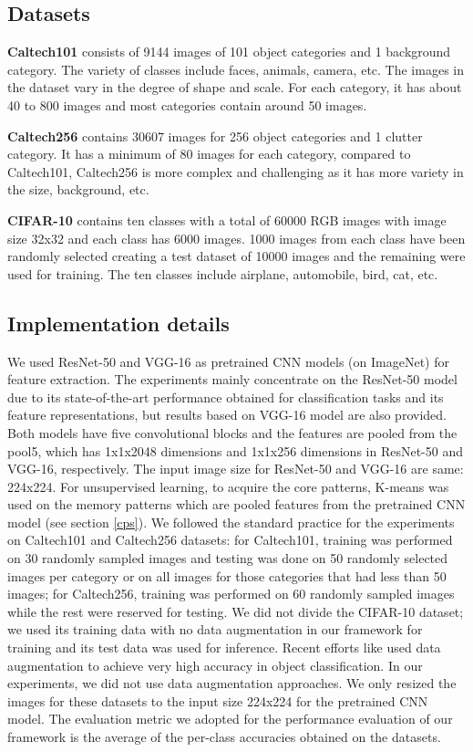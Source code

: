 \documentclass[conference]{IEEEtran}
\begin{document}
\subsection{Datasets}
\textbf{Caltech101} consists of 9144 images of 101 object categories and 1 background category. The variety of classes include faces, animals, camera, etc. The images in the dataset vary in the degree of shape and scale. For each category, it has about 40 to 800 images and most categories contain around 50 images.\par
\textbf{Caltech256} contains 30607 images for 256 object categories and 1 clutter category. It has  a minimum of 80 images for each category, compared to Caltech101, Caltech256 is more complex and challenging as it has more variety in the size, background, etc.\par
\textbf{CIFAR-10} contains ten classes with a total of  60000 RGB images with  image size  32x32 and each class has 6000 images.  1000 images from each class have  been randomly selected creating a  test dataset of 10000 images and the remaining were used for  training. The ten classes include airplane, automobile, bird, cat, etc.

\subsection{Implementation details}
 We used ResNet-50\cite{he2016deep} and VGG-16\cite{simonyan2014very} as pretrained CNN models (on ImageNet)  for feature extraction. The experiments mainly concentrate on the ResNet-50 model due to its state-of-the-art performance obtained for classification tasks and its  feature representations, but  results based on VGG-16 model  are also provided. Both models  have five convolutional blocks and the features are  pooled from the pool5, which has 1x1x2048 dimensions and 1x1x256 dimensions in ResNet-50 and VGG-16, respectively. The input image size for ResNet-50 and VGG-16 are same: 224x224. For unsupervised learning, to acquire the core patterns, K-means was used on the  memory patterns which are pooled features from the pretrained CNN model (see section \ref{cps}). 
We followed the standard practice \cite{bo2013multipath,he2014spatial} for the experiments on Caltech101 and Caltech256 datasets:  for Caltech101,   training was performed on 30  randomly sampled images  and testing was done on  50 randomly selected images   per category  or on all images  for  those categories that had less  than 50 images; for Caltech256,  training was performed on  60  randomly sampled images  while the rest were reserved for testing. We did not divide the  CIFAR-10 dataset; we used its training data with no data augmentation in our  framework for training and its test data  was used for inference. 
Recent efforts like \cite{snoek2015scalable}  used data augmentation  to achieve  very high accuracy in object classification.  In our experiments, we did not use data augmentation  approaches. We only resized the images for these datasets to the input size 224x224 for  the pretrained CNN model. The evaluation metric we adopted for the performance evaluation of our  framework is the average of the per-class accuracies obtained on the datasets.
\end{document}
